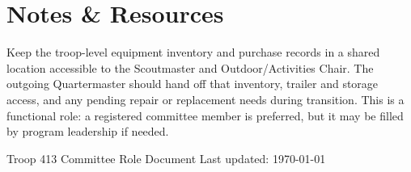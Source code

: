 \documentclass[11pt, letterpaper]{article}
\begin{document}
\vspace{0.6em}

\section{Notes \& Resources}
Keep the troop-level equipment inventory and purchase records in a shared location accessible to the Scoutmaster and Outdoor/Activities Chair. The outgoing Quartermaster should hand off that inventory, trailer and storage access, and any pending repair or replacement needs during transition. This is a functional role: a registered committee member is preferred, but it may be filled by program leadership if needed.

\vfill
\begin{center}
  \footnotesize\color{gray}
  Troop 413 \textbullet{} Committee Role Document \textbullet{} Last updated: \today
\end{center}
\end{document}
